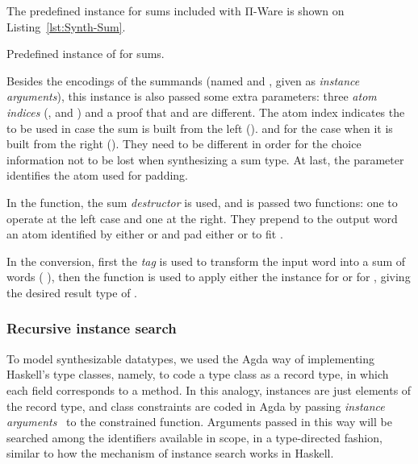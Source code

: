             The predefined instance for sums included with Π-Ware is shown on Listing~\ref{lst:Synth-Sum}.

            \begin{listing}[h]
                \caption{Predefined instance of  for sums.\label{lst:Synth-Sum}}
            \end{listing}

            Besides the encodings of the summands (named  and ,
            given as \emph{instance arguments}), this instance is also passed some extra parameters:
            three \emph{atom indices} (,  and ) and a proof that  and  are different.
            The atom index  indicates the  to be used in case the sum is built from the left ().
            and  for the case when it is built from the right ().
            They need to be different in order for the choice information not to be lost when synthesizing a sum type.
            At last, the  parameter identifies the atom used for padding.

            In the  function, the \AF{[\_,\_]} sum \emph{destructor} is used,
            and is passed two functions: one to operate at the left case and one at the right.
            They prepend to the output word an atom identified by either  or  and pad
            either  or  to fit   .

            In the  conversion, first the \emph{tag} is used to transform the input word into
            a sum of words (    ),
            then the  function is used to apply either the  instance for  or for ,
            giving the desired result type of   .

            \subsubsection{Recursive instance search}
            \label{subsubsec:recursive-instance-search}
            To model synthesizable datatypes, we used the Agda way of implementing Haskell's type classes,
            namely, to code a type class as a record type, in which each field corresponds to a method.
            In this analogy, instances are just elements of the record type, and class constraints are
            coded in Agda by passing \emph{instance arguments}~\cite{typeclasses-agda} to the constrained function.
            Arguments passed in this way will be searched among the identifiers available in scope,
            in a type-directed fashion, similar to how the mechanism of instance search works in Haskell.

